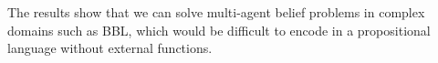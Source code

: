         

The results show that we can solve multi-agent belief problems in complex domains such as BBL, which would be difficult to encode in a propositional language without external functions. 
    
    
    
    

